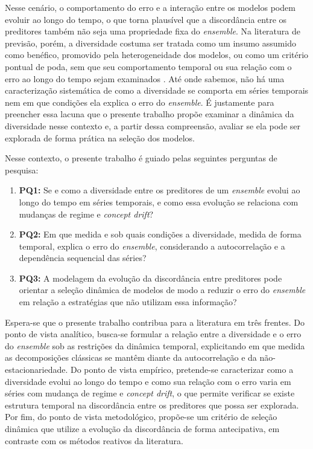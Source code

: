 Nesse cenário, o comportamento do erro e a interação entre os modelos podem evoluir ao longo do tempo, o que torna plausível que a discordância entre os preditores também não seja uma propriedade fixa do \textit{ensemble}. Na literatura de previsão, porém, a diversidade costuma ser tratada como um insumo assumido como benéfico, promovido pela heterogeneidade dos modelos, ou como um critério pontual de poda, sem que seu comportamento temporal ou sua relação com o erro ao longo do tempo sejam examinados \cite{saadallahDriftBasedDynamicEnsemble2020, cerqueiraArbitrageForecastingExperts2019}. Até onde sabemos, não há uma caracterização sistemática de como a diversidade se comporta em séries temporais nem em que condições ela explica o erro do \textit{ensemble}. É justamente para preencher essa lacuna que o presente trabalho propõe examinar a dinâmica da diversidade nesse contexto e, a partir dessa compreensão, avaliar se ela pode ser explorada de forma prática na seleção dos modelos.

Nesse contexto, o presente trabalho é guiado pelas seguintes perguntas de pesquisa:

\begin{enumerate}
    \item \textbf{PQ1:} Se e como a diversidade entre os preditores de um \textit{ensemble} evolui ao longo do tempo em séries temporais, e como essa evolução se relaciona com mudanças de regime e \textit{concept drift}?
    
    \item \textbf{PQ2:} Em que medida e sob quais condições a diversidade, medida de forma temporal, explica o erro do \textit{ensemble}, considerando a autocorrelação e a dependência sequencial das séries?
    
    \item \textbf{PQ3:} A modelagem da evolução da discordância entre preditores pode orientar a seleção dinâmica de modelos de modo a reduzir o erro do \textit{ensemble} em relação a estratégias que não utilizam essa informação?
\end{enumerate}

Espera-se que o presente trabalho contribua para a literatura em três frentes. Do ponto de vista analítico, busca-se formular a relação entre a diversidade e o erro do \textit{ensemble} sob as restrições da dinâmica temporal, explicitando em que medida as decomposições clássicas se mantêm diante da autocorrelação e da não-estacionariedade. Do ponto de vista empírico, pretende-se caracterizar como a diversidade evolui ao longo do tempo e como sua relação com o erro varia em séries com mudança de regime e \textit{concept drift}, o que permite verificar se existe estrutura temporal na discordância entre os preditores que possa ser explorada. Por fim, do ponto de vista metodológico, propõe-se um critério de seleção dinâmica que utilize a evolução da discordância de forma antecipativa, em contraste com os métodos reativos da literatura.
